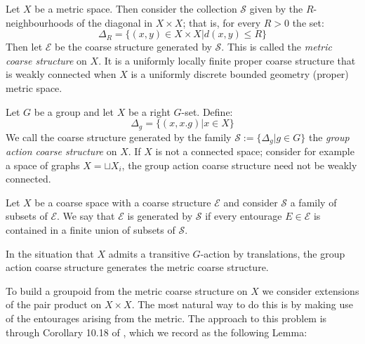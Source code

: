 \begin{example}\label{ex:MCS}
Let $X$ be a metric space. Then consider the collection $\mathcal{S}$ given by the $R$-neighbourhoods of the diagonal in $X\times X$; that is, for every $R>0$ the set:
\begin{equation*}
\Delta_{R}=\lbrace (x,y) \in X \times X | d(x,y)\leq R \rbrace
\end{equation*}
Then let $\mathcal{E}$ be the coarse structure generated by $\mathcal{S}$. This is called the \textit{metric coarse structure} on $X$. It is a uniformly locally finite proper coarse structure that is weakly connected when $X$ is a uniformly discrete bounded geometry (proper) metric space.
\end{example}

\begin{example}\label{ex:GACS}
Let $G$ be a group and let $X$ be a right $G$-set. Define:
\begin{equation*}
\Delta_{g}=\lbrace (x,x.g) | x \in X \rbrace  
\end{equation*}
We call the coarse structure generated by the family $\mathcal{S}:=\lbrace \Delta_{g} | g\in G\rbrace$ the \textit{group action coarse structure} on $X$. If $X$ is not a connected space; consider for example a space of graphs $X=\sqcup X_{i}$, the group action coarse structure need not be weakly connected.
\end{example}

\begin{definition}
Let $X$ be a coarse space with a coarse structure $\mathcal{E}$ and consider $\mathcal{S}$ a family of subsets of $\mathcal{E}$. We say that $\mathcal{E}$ is generated by $\mathcal{S}$ if every entourage $E \in \mathcal{E}$ is contained in a finite union of subsets of $\mathcal{S}$.
\end{definition}

In the situation that $X$ admits a transitive $G$-action by translations, the group action coarse structure generates the metric coarse structure. 

To build a groupoid from the metric coarse structure on $X$ we consider extensions of the pair product on $X \times X$. The most natural way to do this is by making use of the entourages arising from the metric. The approach to this problem is through Corollary 10.18 of \cite{MR2007488}, which we record as the following Lemma:

